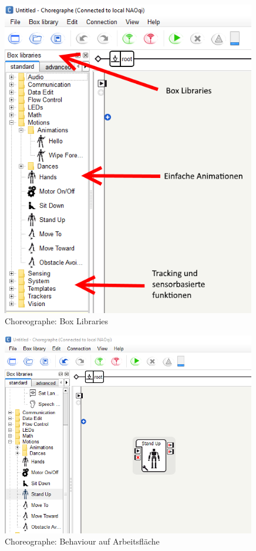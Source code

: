 \begin{appendix}
        \begin{figure}[ht]
            \centering
            \includegraphics[width=0.99\textwidth]{src/pictures/nao-choreo-boxlib.png}
            \caption{Choreographe: Box Libraries}
            \label{img:nao:choreo:boxlib}
        \end{figure}

        \begin{figure}[ht]
            \centering
            \includegraphics[width=0.99\textwidth]{src/pictures/nao-choreo-dad.png}
            \caption{Choreographe: Behaviour auf Arbeitsfläche}
            \label{img:nao:choreo:draganddrop}
        \end{figure}


\end{appendix}
